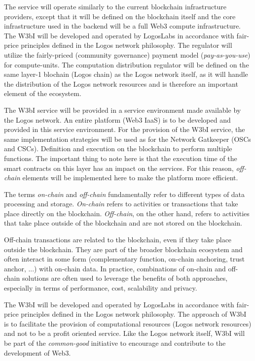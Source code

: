 \documentclass[]{article}
\begin{document}
The service will operate similarly to the current blockchain infrastructure providers, except that it will be defined on the blockchain itself and the core infrastructure used in the backend will be a full Web3 compute infrastructure.
The W3bI will be developed and operated by LogosLabs in accordance with fair-price principles defined in the Logos network philosophy.
The regulator will utilize the fairly-priced (community governance) payment model (\textit{pay-as-you-use}) \cite{WikipediaDoc-payu} for compute-units.
The computation distribution regulator will be defined on the same layer-1 blochain (Logos chain) as the Logos network itself, as it will handle the distribution of the Logos network resources and is therefore an important element of the ecosystem. 

The W3bI service will be provided in a service environment made available by the Logos network.
An entire platform (Web3 IaaS) is to be developed and provided in this service environment.
For the provision of the W3bI service, the same implementation strategies will be used as for the Network Gatkeeper (OSCs and CSCs). 
Definition and execution on the blockchain to perform multiple functions.
The important thing to note here is that the execution time of the smart contracts on this layer has an impact on the services. 
For this reason, \textit{off-chain} elements will be implemented here to make the platform more efficient. 

The terms \textit{on-chain} and \textit{off-chain} fundamentally refer to different types of data processing and storage.
\textit{On-chain} refers to activities or transactions that take place directly on the blockchain.
\textit{Off-chain}, on the other hand, refers to activities that take place outside of the blockchain and are not stored on the blockchain.

Off-chain transactions are related to the blockchain, even if they take place outside the blockchain. 
They are part of the broader blockchain ecosystem and often interact in some form (complementary function, on-chain anchoring, trust anchor, ...) with on-chain data.
In practice, combinations of on-chain and off-chain solutions are often used to leverage the benefits of both approaches, especially in terms of performance, cost, scalability and privacy.

The W3bI will be developed and operated by LogosLabs in accordance with fair-price principles defined in the Logos network philosophy.
The approach of W3bI is to facilitate the provision of computational resources (Logos network resources) and not to be a profit oriented service.
Like the Logos network itself, W3bI will be part of the \textit{common-good} initiative to encourage and contribute to the development of Web3.
\end{document}
